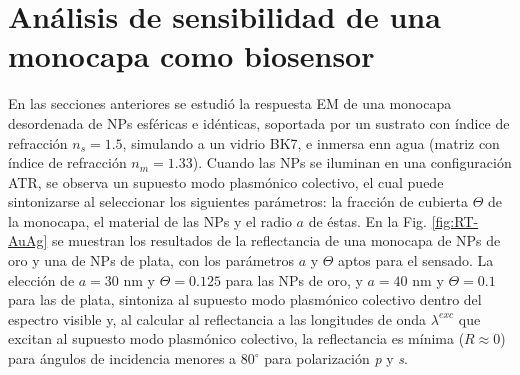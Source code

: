 \section{Análisis de sensibilidad  de una monocapa como biosensor}
\label{section:sensLambda}

En las secciones anteriores se estudió la respuesta EM de una monocapa desordenada de NPs esféricas e idénticas, soportada por un sustrato con índice de refracción $n_s=1.5$, simulando a un vidrio BK7, e inmersa enn agua (matriz con índice de refracción $n_m=1.33$). Cuando las NPs se iluminan en una configuración ATR, se observa un supuesto modo  plasmónico colectivo, el cual puede sintonizarse al seleccionar los siguientes parámetros: la fracción de cubierta $\Theta$ de la monocapa, el material de las NPs y el radio $a$ de éstas. En la Fig. \ref{fig:RT-AuAg} se muestran los resultados de la reflectancia de una monocapa de NPs de oro y una de NPs de plata, con los parámetros $a$ y $\Theta$ aptos para el sensado. La elección de $a=30$ nm y $\Theta=0.125$ para las NPs de oro, y $a=40$ nm y $\Theta=0.1$ para las de plata, sintoniza al supuesto modo  plasmónico colectivo dentro del espectro visible y, al calcular al reflectancia a las longitudes de onda $\lambda^{exc}$ que excitan al supuesto modo  plasmónico colectivo, la reflectancia es mínima ($R\approx 0 $) para ángulos de incidencia menores a $80^\circ$ para polarización \emph{p} y \emph{s}.

